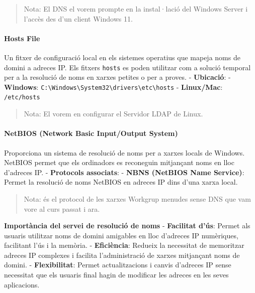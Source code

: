 \documentclass[
  a4paper,
]{article}
\begin{document}
\begin{quote}
Nota: El DNS el vorem prompte en la instal·lació del Windows Server i
l'accès des d'un client Windows 11.
\end{quote}

\paragraph{Hosts File}\label{hosts-file}

Un fitxer de configuració local en els sistemes operatius que mapeja
noms de domini a adreces IP. Els fitxers \texttt{hosts} es poden
utilitzar com a solució temporal per a la resolució de noms en xarxes
petites o per a proves. - \textbf{Ubicació}: - \textbf{Windows}:
\texttt{C:\textbackslash{}Windows\textbackslash{}System32\textbackslash{}drivers\textbackslash{}etc\textbackslash{}hosts}
- \textbf{Linux/Mac}: \texttt{/etc/hosts}

\begin{quote}
Nota: El vorem en configurar el Servidor LDAP de Linux.
\end{quote}

\paragraph{NetBIOS (Network Basic Input/Output
System)}\label{netbios-network-basic-inputoutput-system}

Proporciona un sistema de resolució de noms per a xarxes locals de
Windows. NetBIOS permet que els ordinadors es reconeguin mitjançant noms
en lloc d'adreces IP. - \textbf{Protocols associats}: - \textbf{NBNS
(NetBIOS Name Service)}: Permet la resolució de noms NetBIOS en adreces
IP dins d'una xarxa local.

\begin{quote}
Nota: és el protocol de les xarxes Workgrup menudes sense DNS que vam
vore al curs passat i ara.
\end{quote}

\textbf{Importància del servei de resolució de noms} - \textbf{Facilitat
d'ús}: Permet als usuaris utilitzar noms de domini amigables en lloc
d'adreces IP numèriques, facilitant l'ús i la memòria. -
\textbf{Eficiència}: Redueix la necessitat de memoritzar adreces IP
complexes i facilita l'administració de xarxes mitjançant noms de
domini. - \textbf{Flexibilitat}: Permet actualitzacions i canvis
d'adreces IP sense necessitat que els usuaris final hagin de modificar
les adreces en les seves aplicacions.
\end{document}
